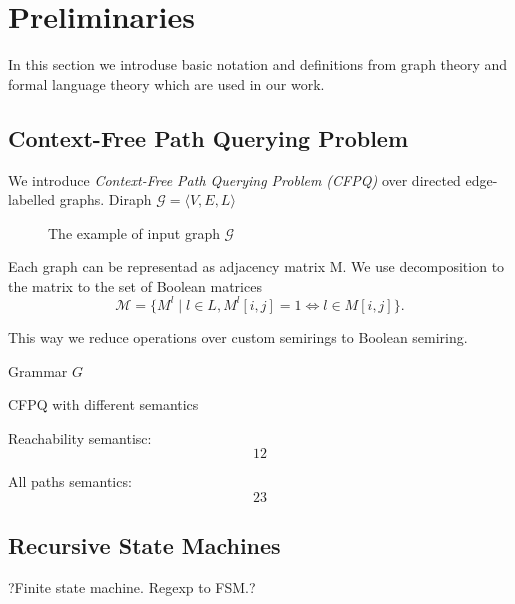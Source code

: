 \section{Preliminaries}

In this section we introduse basic notation and definitions from graph theory and formal language theory which are used in our work.

\subsection{Context-Free Path Querying Problem}

We introduce \textit{Context-Free Path Querying Problem (CFPQ)} over directed edge-labelled graphs.
Diraph $\mathcal{G} = \langle V,E,L \rangle$

\begin{figure}[h]
    \centering        
    \caption{The example of input graph $\mathcal{G}$}
    \label{fig:example_input_graph}
\end{figure}

Each graph can be representad as adjacency matrix M.
We use decomposition to the matrix to the set of Boolean matrices 
$$
\mathcal{M} = \{M^l \mid l \in L, M^l[i,j]=1 \iff l \in M[i,j]\}.
$$

This way we reduce operations over custom semirings to Boolean semiring.

Grammar $G$

CFPQ with different semantics

Reachability semantisc:
$$
12
$$

All paths semantics:
$$
23
$$

\subsection{Recursive State Machines}

?Finite state machine. Regexp to FSM.?

